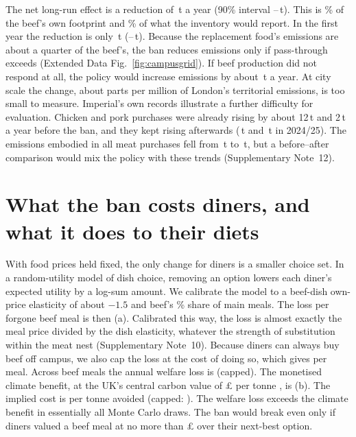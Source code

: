 \documentclass[10pt]{article}
\begin{document}
The net long-run effect is a reduction of \CampusLrNet{}\,t \COtwoe{} a year (90\% interval
\CampusLrNetLo--\CampusLrNetHi{}\,t). This is \CampusNetVsGrossLr\% of the beef's own footprint and
\CampusNetVsAcctLr\% of what the inventory would report. In the first year the reduction is only
\CampusSrNet{}\,t (\CampusSrNetLo--\CampusSrNetHi{}\,t). Because the replacement food's emissions are
about a quarter of the beef's, the ban reduces emissions only if pass-through exceeds
\CampusPhiStar{} (Extended Data Fig.~\ref{fig:campusgrid}). If beef production did not respond at all,
the policy would increase emissions by about \CampusNoResponse{}\,t a year. At city scale the change,
about \CampusPpmLondon{} parts per million of London's territorial emissions, is too small to measure.
Imperial's own records illustrate a further difficulty for evaluation. Chicken and pork purchases
were already rising by about 12\,t and 2\,t a year before the ban, and they kept rising afterwards
(\FoiChickenTwentyFour{}\,t and \FoiPorkTwentyFour{}\,t in 2024/25). The emissions embodied in all meat
purchases fell from \FoiMeatTTwentyThree{}\,t to \FoiMeatTTwentyFour{}\,t, but a before--after comparison
would mix the policy with these trends (Supplementary Note~12).

\section{What the ban costs diners, and what it does to their diets}

With food prices held fixed, the only change for diners is a smaller choice set. In a random-utility
model of dish choice, removing an option lowers each diner's expected utility by a log-sum
amount\cite{small1981,train2009}. We calibrate the model to a beef-dish own-price elasticity of about
$-1.5$\cite{garnett2021,salvi2025} and beef's \PBeefPct\% share of main meals. The loss per forgone beef
meal is then \WelfareLossMeal{} (a). Calibrated this way, the loss is almost
exactly the meal price divided by the dish elasticity, whatever the strength of substitution
within the meat nest (Supplementary Note~10). Because diners can always buy beef off campus, we
also cap the loss at the cost of doing so, which gives \WelfareLossMealCapped{} per meal. Across
\CampusBeefMeals{} beef meals the annual welfare loss is \WelfareLossCappedTotal{} (capped). The
monetised climate benefit, at the UK's central carbon value of £\CarbonValue{} per tonne
\cite{desnz2023carbon}, is \BenefitTotal{} (b). The implied cost is \CostPerT{} per
tonne avoided (capped: \CostPerTCapped{}). The welfare loss exceeds the climate benefit in essentially
all Monte Carlo draws. The ban would break even only if diners valued a beef meal at no more than
£\BreakEvenLossMeal{} over their next-best option.
\end{document}
